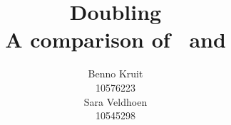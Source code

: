 \documentclass[11pt]{article}
\title{Doubling \dops \\ 
{\normalsize A comparison of \ddop~and \dops}}
\author{Benno Kruit\\10576223\\\And
Sara Veldhoen\\10545298\\}
\date{}
\begin{document}
\newcommand{\dops}[0]{DOP$ ^*$}
\newcommand{\ddop}[0]{Double-DOP}

\maketitle













%
%



\end{document}
